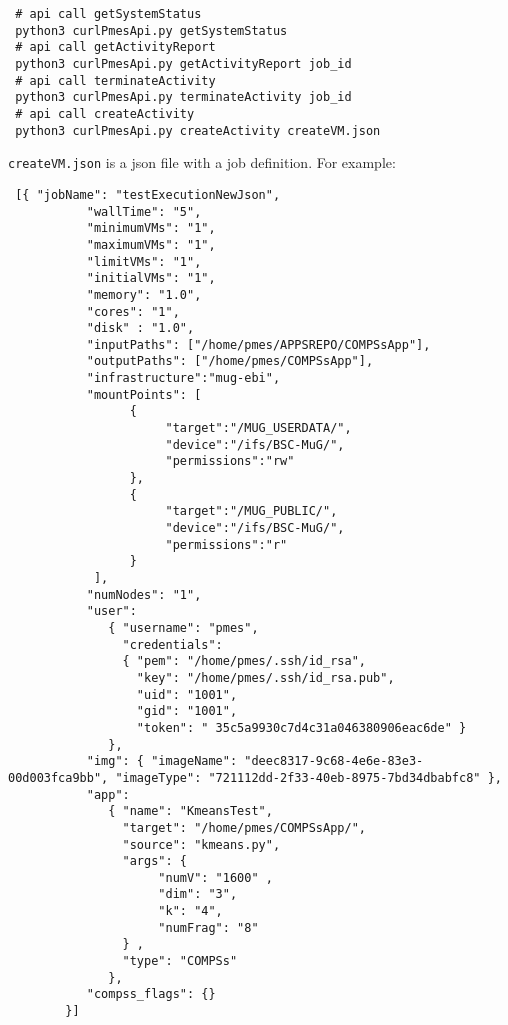 \documentclass[a4paper,10pt]{article}
\begin{document}
\begin{verbatim}
 # api call getSystemStatus
 python3 curlPmesApi.py getSystemStatus
 # api call getActivityReport
 python3 curlPmesApi.py getActivityReport job_id
 # api call terminateActivity
 python3 curlPmesApi.py terminateActivity job_id
 # api call createActivity
 python3 curlPmesApi.py createActivity createVM.json
\end{verbatim}

\texttt{createVM.json} is a json file with a job definition. For example:
\begin{verbatim}
 [{ "jobName": "testExecutionNewJson",
           "wallTime": "5",
           "minimumVMs": "1",
           "maximumVMs": "1",
           "limitVMs": "1",
           "initialVMs": "1",
           "memory": "1.0",
           "cores": "1",
           "disk" : "1.0",
           "inputPaths": ["/home/pmes/APPSREPO/COMPSsApp"],
           "outputPaths": ["/home/pmes/COMPSsApp"],
           "infrastructure":"mug-ebi",
           "mountPoints": [
                 {
                      "target":"/MUG_USERDATA/",
                      "device":"/ifs/BSC-MuG/",
                      "permissions":"rw"
                 },
                 {
                      "target":"/MUG_PUBLIC/",
                      "device":"/ifs/BSC-MuG/",
                      "permissions":"r"
                 }
            ],
           "numNodes": "1",
           "user":
              { "username": "pmes",
                "credentials":
                { "pem": "/home/pmes/.ssh/id_rsa",
                  "key": "/home/pmes/.ssh/id_rsa.pub",
                  "uid": "1001",
                  "gid": "1001",
                  "token": " 35c5a9930c7d4c31a046380906eac6de" }
              },
           "img": { "imageName": "deec8317-9c68-4e6e-83e3-00d003fca9bb", "imageType": "721112dd-2f33-40eb-8975-7bd34dbabfc8" },
           "app":
              { "name": "KmeansTest",
                "target": "/home/pmes/COMPSsApp/",
                "source": "kmeans.py",
                "args": {
                     "numV": "1600" ,
                     "dim": "3",
                     "k": "4",
                     "numFrag": "8"
                } ,
                "type": "COMPSs"
              },
           "compss_flags": {}
        }]
\end{verbatim}
\end{document}

